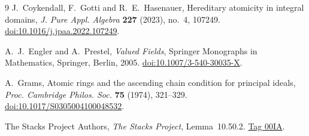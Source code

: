 \documentclass[11pt, letterpaper]{article}
\theoremstyle{definition}
\theoremstyle{remark}
\begin{document}
\begin{thebibliography}{9}
    J.~Coykendall, F.~Gotti and R.~E.~Hasenauer, Hereditary atomicity in integral domains,
    \emph{J. Pure Appl. Algebra} \textbf{227} (2023), no.~4, 107249.
    \href{https://doi.org/10.1016/j.jpaa.2022.107249}{doi:10.1016/j.jpaa.2022.107249}.

    A.~J.~Engler and A.~Prestel, \emph{Valued Fields},
    Springer Monographs in Mathematics, Springer, Berlin, 2005.
    \href{https://doi.org/10.1007/3-540-30035-X}{doi:10.1007/3-540-30035-X}.

    A.~Grams, Atomic rings and the ascending chain condition for principal ideals,
    \emph{Proc. Cambridge Philos. Soc.} \textbf{75} (1974), 321--329.
    \href{https://doi.org/10.1017/S0305004100048532}{doi:10.1017/S0305004100048532}.

    The Stacks Project Authors, \emph{The Stacks Project}, Lemma~10.50.2.
    \href{https://stacks.math.columbia.edu/tag/00IA}{Tag 00IA}.
\end{thebibliography}
\end{document}
